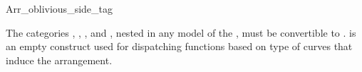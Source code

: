 
\ccRefPageBegin

\begin{ccRefClass}{Arr_oblivious_side_tag}

\ccDefinition

The categories , ,
, and ,
nested in any model of the , must be
convertible to \ccRefName. \ccRefName{} is an empty construct used
for dispatching functions based on type of curves that induce the
arrangement.


\ccSeeAlso
    \\

\end{ccRefClass}

\ccRefPageEnd
